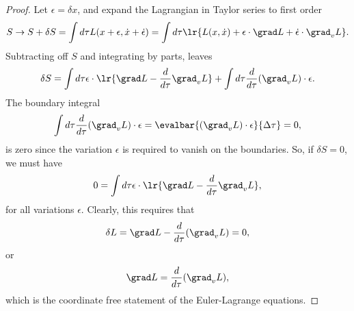 \begin{proof}
Let \( \epsilon = \delta x \), and expand the
Lagrangian in Taylor series to first order
\begin{dmath}\label{eqn:lorentzForceCovariant:60}
S \rightarrow
S + \delta S
= \int d\tau L( x + \epsilon, \dot{x} + \dot{\epsilon})
=
\int d\tau \lr{
   L(x, \dot{x}) + \epsilon \cdot \grad L + \dot{\epsilon} \cdot \grad_v L
}.
\end{dmath}
Subtracting off \( S \) and integrating by parts, leaves
\begin{dmath}\label{eqn:lorentzForceCovariant:80}
\delta S =
\int d\tau \epsilon \cdot \lr{
   \grad L - \frac{d}{d\tau} \grad_v L
}
+
\int d\tau \frac{d}{d\tau} (\grad_v L ) \cdot \epsilon.
\end{dmath}
The boundary integral
\begin{equation}\label{eqn:lorentzForceCovariant:100}
\int d\tau \frac{d}{d\tau} (\grad_v L ) \cdot \epsilon
=
\evalbar{(\grad_v L ) \cdot \epsilon}{\Delta \tau} = 0,
\end{equation}
is zero since the variation \( \epsilon \) is required to vanish on the boundaries.  So, if \( \delta S = 0 \), we must have
\begin{dmath}\label{eqn:lorentzForceCovariant:120}
0 =
\int d\tau \epsilon \cdot \lr{
   \grad L - \frac{d}{d\tau} \grad_v L
},
\end{dmath}
for all variations \( \epsilon \).  Clearly, this requires that
\begin{equation}\label{eqn:lorentzForceCovariant:140}
\delta L = \grad L - \frac{d}{d\tau} (\grad_v L) = 0,
\end{equation}
or
\begin{equation}\label{eqn:lorentzForceCovariant:145}
\grad L = \frac{d}{d\tau} (\grad_v L),
\end{equation}
which is the coordinate free statement of the Euler-Lagrange equations.
\end{proof}
